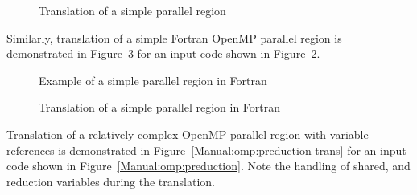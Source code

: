 \begin{figure}[htbp]
{\indent
  {\mySmallFontSize
    \begin{latexonly}
    
    \end{latexonly}
    \begin{htmlonly}
    
    \end{htmlonly}
  }
}
\caption{Translation of a simple parallel region}
\label{Manual:omp:hello1-trans}
\end{figure}

Similarly, translation of a simple Fortran OpenMP parallel region 
is demonstrated in
Figure~\ref{Manual:omp:hello1-trans-f} for an input code shown in
Figure~\ref{Manual:omp:hello1-f}.

\lstset{language=Fortran,basicstyle=\scriptsize}
\lstset{language=Fortran,basicstyle=\scriptsize,numbers=left}
\begin{figure}[htbp]
{\indent
  {\mySmallFontSize
    \begin{latexonly}
    
    \end{latexonly}
    \begin{htmlonly}
    
    \end{htmlonly}
  }
}
\caption{Example of a simple parallel region in Fortran}
\label{Manual:omp:hello1-f}
\end{figure}

\begin{figure}[htbp]
{\indent
  {\mySmallFontSize
    \begin{latexonly}
    
    \end{latexonly}
    \begin{htmlonly}
    
    \end{htmlonly}
  }
}
\caption{Translation of a simple parallel region in Fortran}
\label{Manual:omp:hello1-trans-f}
\end{figure}




Translation of a relatively complex OpenMP parallel region with variable references is demonstrated in
Figure~\ref{Manual:omp:preduction-trans} for an input code shown in
Figure~\ref{Manual:omp:preduction}. 
Note the handling of shared, and reduction variables during the translation.

